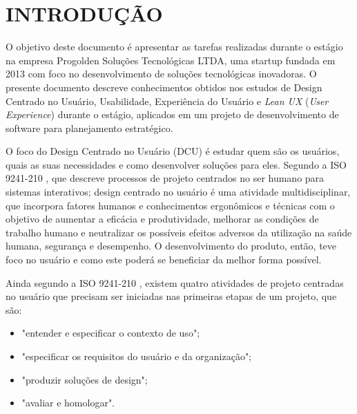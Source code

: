 \chapter{INTRODUÇÃO}

O objetivo deste documento é apresentar as tarefas realizadas durante o estágio na empresa Progolden Soluções Tecnológicas LTDA, uma startup fundada em 2013 com foco no desenvolvimento de soluções tecnológicas inovadoras. O presente documento descreve conhecimentos obtidos nos estudos de Design Centrado no Usuário, Usabilidade, Experiência do Usuário e \textit{Lean UX} (\textit{User Experience}) durante o estágio, aplicados em um projeto de desenvolvimento de software para planejamento estratégico.

O foco do Design Centrado no Usuário (DCU) é estudar quem são os usuários, quais as suas necessidades e como desenvolver soluções para eles. Segundo a ISO 9241-210 \cite{iso9241}, que descreve processos de projeto centrados no ser humano para sistemas interativos; design centrado no usuário é uma atividade multidisciplinar, que incorpora fatores humanos e conhecimentos ergonômicos e técnicas com o objetivo de aumentar a eficácia e produtividade, melhorar as condições de trabalho humano e neutralizar os possíveis efeitos adversos da utilização na saúde humana, segurança e desempenho. O desenvolvimento do produto, então, teve foco no usuário e como este poderá se beneficiar da melhor forma possível. 


Ainda segundo a ISO 9241-210 \cite{iso9241}, existem quatro atividades de projeto centradas no usuário que precisam ser iniciadas nas primeiras etapas de um projeto, que são:

\begin{itemize}

\item "entender e especificar o contexto de uso";

\item "especificar os requisitos do usuário e da organização";

\item "produzir soluções de design";

\item "avaliar e homologar".

\end{itemize}

